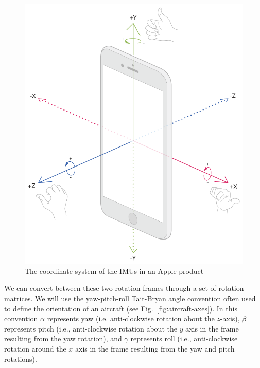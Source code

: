 \documentclass[10pt]{article}
\begin{document}
\begin{figure}[bh]
\begin{center}
\includegraphics[height=.3\textheight]{../images/core-motion.png}
\caption{\label{fig:iphone-coordinates}The coordinate system of the IMUs in an Apple product \cite{appledocumentation} }
\end{center}
\end{figure}

We can convert between these two rotation frames through a set of rotation matrices. We will use the yaw-pitch-roll Tait-Bryan angle convention often used to define the orientation of an aircraft (see Fig.~\ref{fig:aircraft-axes}). In this convention $\alpha$ represents yaw (i.e. anti-clockwise rotation about the $z$-axis), $\beta$ represents pitch (i.e., anti-clockwise rotation about the $y$ axis in the frame resulting from the yaw rotation), and $\gamma$ represents roll (i.e., anti-clockwise rotation around the $x$ axis in the frame resulting from the yaw and pitch rotations).
\end{document}
